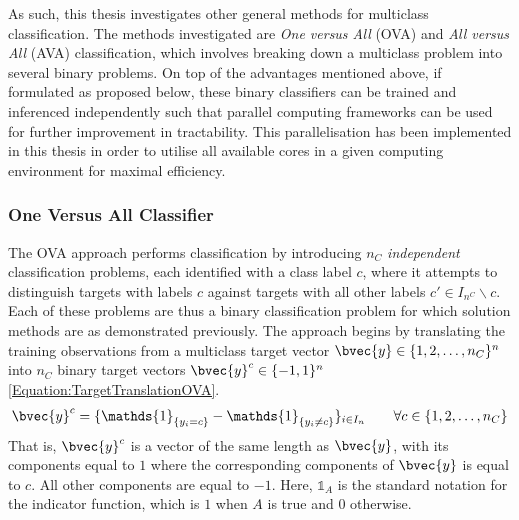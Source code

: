 			As such, this thesis investigates other general methods for multiclass classification. The methods investigated are \textit{One versus All} (OVA) and \textit{All versus All} (AVA) classification, which involves breaking down a multiclass problem into several binary problems. On top of the advantages mentioned above, if formulated as proposed below, these binary classifiers can be trained and inferenced independently such that parallel computing frameworks can be used for further improvement in tractability. This parallelisation has been implemented in this thesis in order to utilise all available cores in a given computing environment for maximal efficiency.
	
			\subsubsection{One Versus All Classifier}
			\label{BenthicHabitatMapping:Classification:MulticlassClassification:OVA}
						
				The OVA approach performs classification by introducing $n_{C}$ \textit{independent} classification problems, each identified with a class label $c$, where it attempts to distinguish targets with labels $c$ against targets with all other labels $c' \in I_{n^{C}} \backslash c$. Each of these problems are thus a binary classification problem for which solution methods are as demonstrated previously. The approach begins by translating the training observations from a multiclass target vector $\bvec{y} \in \{1, 2, \dots, n_{C}\}^{n}$ into $n_{C}$ binary target vectors $\bvec{y}^{c} \in \{-1, 1\}^{n}$ \eqref{Equation:TargetTranslationOVA}. \begin{equation}
					\bvec{y}^{c} = \{\mathds{1}_{\{y_{i} = c\}} - \mathds{1}_{\{y_{i} \neq c\}}\}_{i \in I_{n}} \qquad \forall c \in \{1, 2, \dots, n_{C}\}
				\label{Equation:TargetTranslationOVA}
				\end{equation} That is, $\bvec{y}^{c}$ is a vector of the same length as $\bvec{y}$, with its components equal to $1$ where the corresponding components of $\bvec{y}$ is equal to $c$. All other components are equal to $-1$. Here, $\mathds{1}_{A}$ is the standard notation for the indicator function, which is $1$ when $A$ is true and $0$ otherwise.
				
